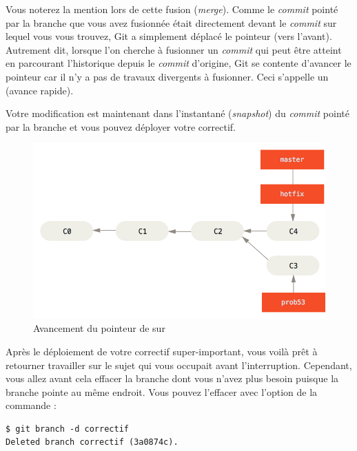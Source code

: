 Vous noterez la mention  lors de cette fusion (\emph{merge}).
Comme le \emph{commit}  pointé par la branche  que vous avez fusionnée était directement devant le \emph{commit}  sur lequel vous vous trouvez, Git a simplement déplacé le pointeur (vers l'avant).
Autrement dit, lorsque l'on cherche à fusionner un \emph{commit} qui peut être atteint en parcourant l'historique depuis le \emph{commit} d'origine, Git se contente d'avancer le pointeur car il n'y a pas de travaux divergents à fusionner. Ceci s'appelle un  (avance rapide).

Votre modification est maintenant dans l'instantané (\emph{snapshot}) du \emph{commit} pointé par la branche  et vous pouvez déployer votre correctif.

\begin{figure}[!h]
  \centering
  \includegraphics{images/basic-branching-5}
  \caption{Avancement du pointeur de  sur }
  \label{fig:git:basic-branching-5}
\end{figure}

Après le déploiement de votre correctif super-important, vous voilà prêt à retourner travailler sur le sujet qui vous occupait avant l'interruption.
Cependant, vous allez avant cela effacer la branche  dont vous n'avez plus besoin puisque la branche  pointe au même endroit.
Vous pouvez l'effacer avec l'option  de la commande :

\begin{Schunk}
\begin{Verbatim}
$ git branch -d correctif
Deleted branch correctif (3a0874c).
\end{Verbatim}
\end{Schunk}

